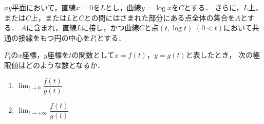 \documentclass[../../main.tex]{subfiles}
\begin{document}
$xy$平面において，直線$x=0$を$L$とし，曲線$y=\log x$を$C$とする．
さらに，$L$上，または$C$上，または$L$と$C$との間にはさまれた部分にある点全体の集合を$A$とする．
$A$に含まれ，直線$L$に接し，かつ曲線$C$と点$(t,\log t)$ $(0<t)$において共通の接線をもつ円の中心を$P_t$とする．

$P_t$の$x$座標，$y$座標を$t$の関数として$x=f(t)$，$y=g(t)$と表したとき，
次の極限値はどのような数となるか．
\begin{enumerate}
  \item $\displaystyle\lim_{t\to0}\dfrac{f(t)}{g(t)}$
  \item $\displaystyle\lim_{t\to+\infty}\dfrac{f(t)}{g(t)}$
\end{enumerate}
\end{document}
